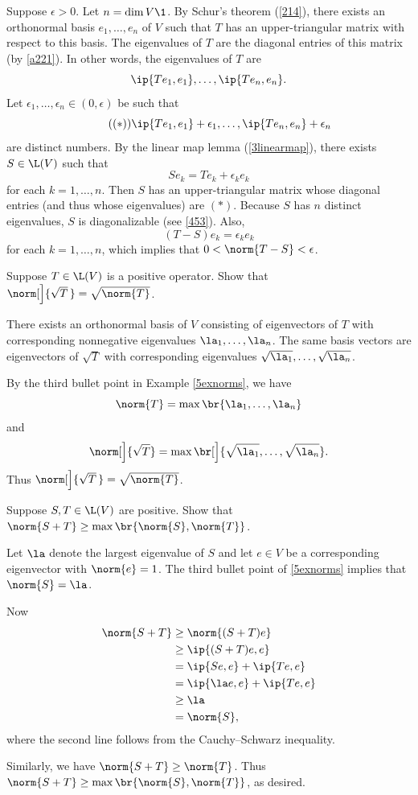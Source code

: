 \begin{Solution}
Suppose $\epsilon > 0$. Let $n = \dim V\1$. By Schur's theorem (\ref{214}), there exists an orthonormal basis $e_1, \ldots, e_n$ of $V$ such that $T$ has an upper-triangular matrix with respect to this basis. The eigenvalues of $T$ are the diagonal entries of this matrix (by \ref{a221}). In other words, the eigenvalues of $T$ are
\[
\ip{Te_1, e_1}, \ldots, \ip{Te_n,e_n}.
\]
Let $\epsilon_1, \ldots, \epsilon_n \in (0, \epsilon)$ be such that
\begin{equation*} \tag{$(*)$}
\ip{Te_1, e_1} + \epsilon_1, \ldots, \ip{Te_n,e_n} + \epsilon_n
\end{equation*}%
are distinct numbers. By the linear map lemma (\ref{3linearmap}), there exists $S \in \L(V)$ such that
\[
Se_k = Te_k + \epsilon_k e_k
\]
for each $k = 1, \ldots, n$. Then $S$ has an upper-triangular matrix whose diagonal entries (and thus whose eigenvalues) are $(*)$. Because $S$ has $n$ distinct eigenvalues, $S$ is diagonalizable (see \ref{453}). Also,
\[
(T-S)e_k = \epsilon_k e_k
\]
for each $k= 1, \ldots, n$, which implies that $0 < \norm{T - S} < \epsilon$.
\end{Solution}

\exercise
Suppose $T \in \L(V)$ is a positive operator. Show that $\norm[\Big]{\sqrt{T}\,} = \sqrt{\norm{T}}$.

\begin{Solution}
There exists an orthonormal basis of $V$ consisting of eigenvectors of $T$ with corresponding nonnegative eigenvalues
$\la_1, \ldots, \la_n$. The same basis vectors are eigenvectors of $\sqrt{T}$ with corresponding eigenvalues
$\sqrt{\la_1}, \ldots, \sqrt{\la_n}$.

By the third bullet point in Example \ref{5exnorms}, we have
\[
\norm{T} = \max \br{ \la_1, \ldots, \la_n }
\]
and
\[
\norm[\Big]{\sqrt{T}} = \max \br[\Big]{ \sqrt{\la_1}, \ldots, \sqrt{\la_n} }.
\]
Thus $\norm[\Big]{\sqrt{T}\,} = \sqrt{\norm{T}}$.
\end{Solution}

\exercise
Suppose $S, T \in \L(V)$ are positive. Show that \mbox{$\norm{S+T} \ge \max\br{ \norm{S}, \norm{T} }$}.

\begin{Solution}
Let $\la$ denote the largest eigenvalue of $S$ and let $e \in V$ be a corresponding eigenvector with $\norm{e} = 1$. The third bullet point of \ref{5exnorms} implies that $\norm{S} = \la$.

Now
\begin{align*}
\norm{S+T} &\ge \norm{(S+T)e} \\
&\ge \ip{ (S+T)e, e} \\
&= \ip{Se,e} + \ip{Te, e} \\
&= \ip{\la e, e} + \ip{Te, e}\\
&\ge  \la \\
&= \norm{S},
\end{align*}
where the second line follows from the Cauchy--Schwarz inequality.

Similarly, we have $\norm{S+T} \ge \norm{T}$. Thus $\norm{S+T} \ge \max\br{ \norm{S}, \norm{T} }$, as desired.
\end{Solution}


